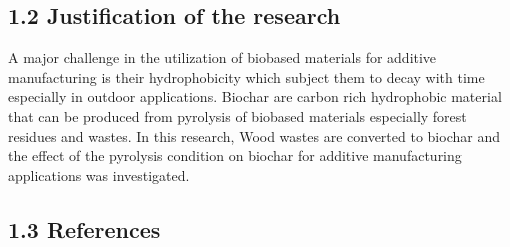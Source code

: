 \documentclass[
]{article}
\begin{document}
\subsection{1.2 Justification of the
research}\label{justification-of-the-research}

A major challenge in the utilization of biobased materials for additive
manufacturing is their hydrophobicity which subject them to decay with
time especially in outdoor applications. Biochar are carbon rich
hydrophobic material that can be produced from pyrolysis of biobased
materials especially forest residues and wastes. In this research, Wood
wastes are converted to biochar and the effect of the pyrolysis
condition on biochar for additive manufacturing applications was
investigated.

\subsection{1.3 References}\label{references}
\end{document}
